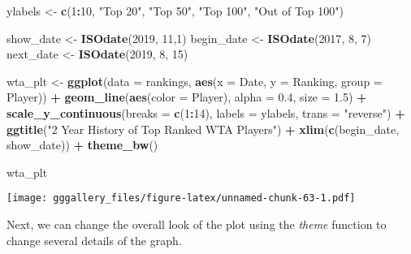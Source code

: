 \documentclass[]{book}
\newenvironment{Shaded}{\begin{snugshade}}{\end{snugshade}}
\newcommand{\DataTypeTok}[1]{\textcolor[rgb]{0.13,0.29,0.53}{#1}}
\newcommand{\DecValTok}[1]{\textcolor[rgb]{0.00,0.00,0.81}{#1}}
\newcommand{\FloatTok}[1]{\textcolor[rgb]{0.00,0.00,0.81}{#1}}
\newcommand{\KeywordTok}[1]{\textcolor[rgb]{0.13,0.29,0.53}{\textbf{#1}}}
\newcommand{\NormalTok}[1]{#1}
\newcommand{\OperatorTok}[1]{\textcolor[rgb]{0.81,0.36,0.00}{\textbf{#1}}}
\newcommand{\StringTok}[1]{\textcolor[rgb]{0.31,0.60,0.02}{#1}}
\begin{document}
\begin{Shaded}
\begin{Highlighting}[]
\NormalTok{ylabels <-}\StringTok{ }\KeywordTok{c}\NormalTok{(}\DecValTok{1}\OperatorTok{:}\DecValTok{10}\NormalTok{, }\StringTok{"Top 20"}\NormalTok{, }\StringTok{"Top 50"}\NormalTok{, }\StringTok{"Top 100"}\NormalTok{, }\StringTok{"Out of Top 100"}\NormalTok{)}


\NormalTok{show_date <-}\StringTok{ }\KeywordTok{ISOdate}\NormalTok{(}\DecValTok{2019}\NormalTok{, }\DecValTok{11}\NormalTok{,}\DecValTok{1}\NormalTok{)}
\NormalTok{begin_date <-}\StringTok{ }\KeywordTok{ISOdate}\NormalTok{(}\DecValTok{2017}\NormalTok{, }\DecValTok{8}\NormalTok{, }\DecValTok{7}\NormalTok{)}
\NormalTok{next_date <-}\StringTok{ }\KeywordTok{ISOdate}\NormalTok{(}\DecValTok{2019}\NormalTok{, }\DecValTok{8}\NormalTok{, }\DecValTok{15}\NormalTok{)}


\NormalTok{wta_plt <-}\StringTok{ }\KeywordTok{ggplot}\NormalTok{(}\DataTypeTok{data =}\NormalTok{ rankings, }\KeywordTok{aes}\NormalTok{(}\DataTypeTok{x =}\NormalTok{ Date, }\DataTypeTok{y =}\NormalTok{ Ranking, }\DataTypeTok{group =}\NormalTok{ Player)) }\OperatorTok{+}\StringTok{ }
\StringTok{  }\KeywordTok{geom_line}\NormalTok{(}\KeywordTok{aes}\NormalTok{(}\DataTypeTok{color =}\NormalTok{ Player), }\DataTypeTok{alpha =} \FloatTok{0.4}\NormalTok{, }\DataTypeTok{size =} \FloatTok{1.5}\NormalTok{) }\OperatorTok{+}
\StringTok{  }\KeywordTok{scale_y_continuous}\NormalTok{(}\DataTypeTok{breaks =} \KeywordTok{c}\NormalTok{(}\DecValTok{1}\OperatorTok{:}\DecValTok{14}\NormalTok{), }\DataTypeTok{labels =}\NormalTok{ ylabels, }\DataTypeTok{trans =} \StringTok{"reverse"}\NormalTok{) }\OperatorTok{+}\StringTok{ }
\StringTok{  }\KeywordTok{ggtitle}\NormalTok{(}\StringTok{"2 Year History of Top Ranked WTA Players"}\NormalTok{) }\OperatorTok{+}\StringTok{ }
\StringTok{  }\KeywordTok{xlim}\NormalTok{(}\KeywordTok{c}\NormalTok{(begin_date, show_date)) }\OperatorTok{+}
\StringTok{  }\KeywordTok{theme_bw}\NormalTok{() }

\NormalTok{wta_plt}
\end{Highlighting}
\end{Shaded}

\texttt{[image: gggallery\_files/figure-latex/unnamed-chunk-63-1.pdf]}

Next, we can change the overall look of the plot using the \emph{theme} function to change several
details of the graph.
\end{document}
